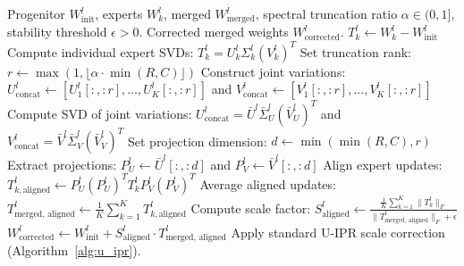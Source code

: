 \documentclass{article}
\begin{document}
\begin{algorithm}[H]
\caption{Subspace-Aligned Isotropic Parameter Resonance (SA-IPR)}
\label{alg:sa_ipr}
\begin{algorithmic}[1]
\REQUIRE Progenitor $W_{\text{init}}^l$, experts $W_k^l$, merged $W_{\text{merged}}^l$, spectral truncation ratio $\alpha \in (0, 1]$, stability threshold $\epsilon > 0$.
\ENSURE Corrected merged weights $W_{\text{corrected}}^l$.
    \STATE $T_k^l \leftarrow W_k^l - W_{\text{init}}^l$
        \STATE Compute individual expert SVDs: $T_k^l = U_k^l \Sigma_k^l (V_k^l)^T$
        \STATE Set truncation rank: $r \leftarrow \max(1, \lfloor \alpha \cdot \min(R, C) \rfloor)$
        \STATE Construct joint variations: $U_{\text{concat}}^l \leftarrow \left[ U_1^l[:, :r], \dots, U_K^l[:, :r] \right]$ and $V_{\text{concat}}^l \leftarrow \left[ V_1^l[:, :r], \dots, V_K^l[:, :r] \right]$
        \STATE Compute SVD of joint variations: $U_{\text{concat}}^l = \bar{U}^l \bar{\Sigma}_U^l (\bar{V}_U^l)^T$ and $V_{\text{concat}}^l = \bar{V}^l \bar{\Sigma}_V^l (\bar{V}_V^l)^T$
        \STATE Set projection dimension: $d \leftarrow \min(\min(R, C), r)$
        \STATE Extract projections: $P_U^l \leftarrow \bar{U}^l[:, :d]$ and $P_V^l \leftarrow \bar{V}^l[:, :d]$
        \STATE Align expert updates: $T_{k, \text{aligned}}^l \leftarrow P_U^l (P_U^l)^T T_k^l P_V^l (P_V^l)^T$
        \STATE Average aligned updates: $T_{\text{merged, aligned}}^l \leftarrow \frac{1}{K} \sum_{k=1}^K T_{k, \text{aligned}}^l$
        \STATE Compute scale factor: $S_{\text{aligned}}^l \leftarrow \frac{\frac{1}{K} \sum_{k=1}^K \|T_k^l\|_F}{\|T_{\text{merged, aligned}}^l\|_F + \epsilon}$
        \STATE $W_{\text{corrected}}^l \leftarrow W_{\text{init}}^l + S_{\text{aligned}}^l \cdot T_{\text{merged, aligned}}^l$
    \ELSE
        \STATE Apply standard U-IPR scale correction (Algorithm~\ref{alg:u_ipr}).
    \ENDIF
\ENDFOR
\end{algorithmic}
\end{algorithm}
\end{document}
